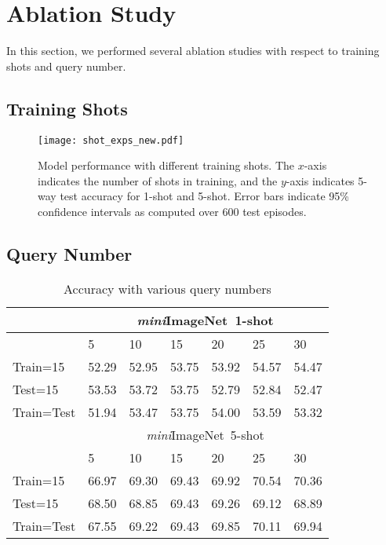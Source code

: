\documentclass{article} \usepackage{iclr2019_conference,times}
\def\mini{{\textit{mini}ImageNet}}
\begin{document}
\appendix




\section{Ablation Study}

In this section, we performed several ablation studies with respect to training shots and query number.

\subsection{Training Shots}
\label{sec:shots}
\begin{figure}[ht]
  \centering
  \texttt{[image: shot\_exps\_new.pdf]}
  \caption{Model performance with different training shots. The $x$-axis indicates the number of shots in training, and the $y$-axis indicates 5-way test accuracy for 1-shot and 5-shot. Error bars indicate 95\% confidence intervals as computed over 600 test episodes. }
  \label{shot_exps}
\end{figure}


\subsection{Query Number}

\begin{table}[ht]
\centering
\small
\caption{Accuracy with various query numbers}
\begin{tabular}{l|llllll}
\hline
           & \multicolumn{6}{c}{\mini~1-shot} \\ \hline
           & 5     & 10    & 15    & 20    & 25     & 30                \\ \hline
Train=15   & 52.29 & 52.95 & 53.75 & 53.92 & 54.57  & 54.47   \\
Test=15    & 53.53 & 53.72 & 53.75 & 52.79 & 52.84  & 52.47   \\
Train=Test & 51.94 & 53.47 & 53.75 & 54.00 & 53.59  & 53.32  \\ \hline
           & \multicolumn{6}{c}{\mini~5-shot}  \\ \hline
           & 5     & 10    & 15    & 20    & 25    & 30 \\ \hline
Train=15   & 66.97 & 69.30 & 69.43 & 69.92 & 70.54 &  70.36    \\
Test=15    & 68.50 & 68.85 & 69.43 & 69.26 & 69.12 & 68.89    \\      
Train=Test & 67.55 & 69.22 & 69.43 & 69.85 & 70.11 & 69.94    \\ \hline
\end{tabular}
\label{tab:query}
\end{table}
\end{document}
